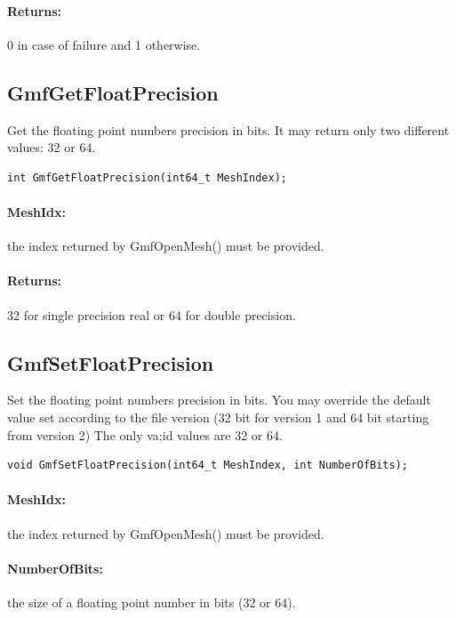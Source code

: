 \documentclass[a4paper,12pt]{article}
\begin{document}
\paragraph{Returns:} 0 in case of failure and 1 otherwise.


\subsection{GmfGetFloatPrecision}
Get the floating point numbers precision in bits.
It may return only two different values: 32 or 64.

\begin{tt}
\begin{verbatim}
int GmfGetFloatPrecision(int64_t MeshIndex);
\end{verbatim}
\end{tt}
\normalfont

\paragraph{MeshIdx:}
the index returned by GmfOpenMesh() must be provided.

\paragraph{Returns:} 32 for single precision real or 64 for double precision.


\subsection{GmfSetFloatPrecision}
Set the floating point numbers precision in bits.
You may override the default value set according to the file version (32 bit for version 1 and 64 bit starting from version 2)
The only va;id values are 32 or 64.

\begin{tt}
\begin{verbatim}
void GmfSetFloatPrecision(int64_t MeshIndex, int NumberOfBits);
\end{verbatim}
\end{tt}
\normalfont

\paragraph{MeshIdx:}
the index returned by GmfOpenMesh() must be provided.

\paragraph{NumberOfBits:}
the size of a floating point number in bits (32 or 64).
\end{document}
